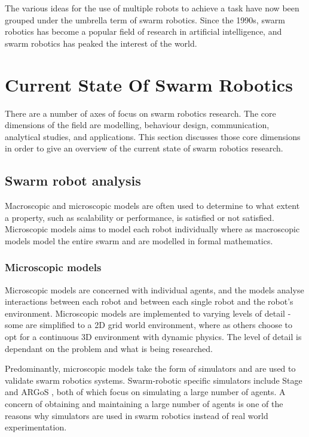 The various ideas for the use of multiple robots to achieve a task have now been grouped under the umbrella term of swarm robotics. Since the 1990s, swarm robotics has become a popular field of research in artificial intelligence, and swarm robotics has peaked the interest of the world. 


\section{Current State Of Swarm Robotics}
\label{currentstate}

There are a number of axes of focus on swarm robotics research. The core dimensions of the field are modelling, behaviour design, communication, analytical studies, and applications. This section discusses those core dimensions in order to give an overview of the current state of swarm robotics research. 

\subsection{Swarm robot analysis}
Macroscopic and microscopic models are often used to determine to what extent a property, such as scalability or performance, is satisfied or not satisfied. Microscopic models aims to model each robot individually where as macroscopic models model the entire swarm and are modelled in formal mathematics.

\subsubsection{Microscopic models}
\label{microscopicmodels}

Microscopic models are concerned with individual agents, and the models analyse interactions between each robot and between each single robot and the robot's environment. Microscopic models are implemented to varying levels of detail - some are simplified to a 2D grid world environment, where as others choose to opt for a continuous 3D environment with dynamic physics. The level of detail is dependant on the problem and what is being researched. 

Predominantly, microscopic models take the form of simulators and are used to validate swarm robotics systems. Swarm-robotic specific simulators include Stage \cite{vaughan2008massively} and ARGoS \cite{pinciroli2011argos}, both of which focus on simulating a large number of agents. A concern of obtaining and maintaining a large number of agents is one of the reasons why simulators are used in swarm robotics instead of real world experimentation.

